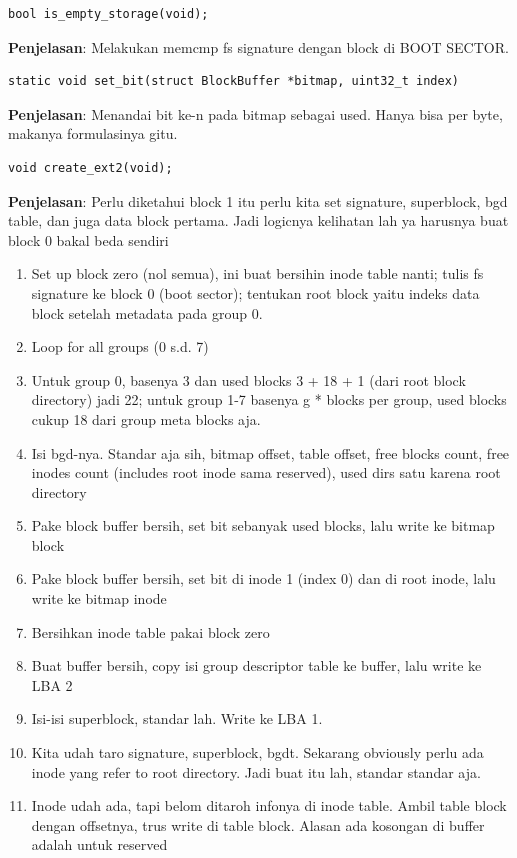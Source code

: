 \begin{lstlisting}
bool is_empty_storage(void);
\end{lstlisting}

\textbf{Penjelasan}: Melakukan memcmp fs signature dengan block di BOOT SECTOR.

\begin{lstlisting}
static void set_bit(struct BlockBuffer *bitmap, uint32_t index)
\end{lstlisting}

\textbf{Penjelasan}: Menandai bit ke-n pada bitmap sebagai used. Hanya bisa per byte, makanya formulasinya gitu.

\begin{lstlisting}
void create_ext2(void);
\end{lstlisting}

\textbf{Penjelasan}:
Perlu diketahui block 1 itu perlu kita set signature, superblock, bgd table, dan juga data block pertama. Jadi logicnya kelihatan lah ya harusnya buat block 0 bakal beda sendiri

\begin{enumerate}
    \item Set up block zero (nol semua), ini buat bersihin inode table nanti; tulis fs signature ke block 0 (boot sector); tentukan root block yaitu indeks data block setelah metadata pada group 0.
    \item Loop for all groups (0 s.d. 7)
    \item Untuk group 0, basenya 3 dan used blocks 3 + 18 + 1 (dari root block directory) jadi 22; untuk group 1-7 basenya g * blocks per group, used blocks cukup 18 dari group meta blocks aja.
    \item Isi bgd-nya. Standar aja sih, bitmap offset, table offset, free blocks count, free inodes count (includes root inode sama reserved), used dirs satu karena root directory
    \item Pake block buffer bersih, set bit sebanyak used blocks, lalu write ke bitmap block
    \item Pake block buffer bersih, set bit di inode 1 (index 0) dan di root inode, lalu write ke bitmap inode
    \item Bersihkan inode table pakai block zero
    \item Buat buffer bersih, copy isi group descriptor table ke buffer, lalu write ke LBA 2
    \item Isi-isi superblock, standar lah. Write ke LBA 1.
    \item Kita udah taro signature, superblock, bgdt. Sekarang obviously perlu ada inode yang refer to root directory. Jadi buat itu lah, standar standar aja.
    \item Inode udah ada, tapi belom ditaroh infonya di inode table. Ambil table block dengan offsetnya, trus write di table block. Alasan ada kosongan di buffer adalah untuk reserved
\end{enumerate}

